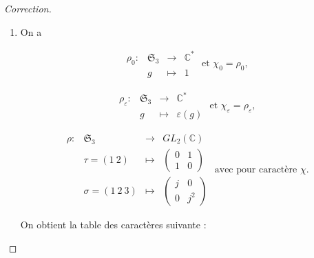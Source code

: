 \documentclass[french]{book}
\theoremstyle{definition}
\theoremstyle{remark}
\newtheorem*{remark}{Remarque}
\begin{document}
\begin{proof}[Correction]
\begin{enumerate}
\begin{enumerate}
\begin{enumerate}
        \begin{remark}[Personnelle]
          \textcolor{red}{3} correpond au nombre de \textcolor{red}{transpositions} dans \(\mathfrak{S}_{3}\) et \textcolor{blue}{2} correspond au nombre de \textcolor{blue}{3-cycles}. Puisque les transpositions (respectivement les 3-cycles) sont conjugués dans \(\mathfrak{S}_{3}\), la valeur de \(\rho_g\) et donc de \(\chi(g)\) est identique pour chaque transposition (respectivement pour chaque 3-cycle), donc on multiplie par 3 (respectivement par 2).
        \end{remark}

        \

        Donc \(\chi\) est bien un caractère \textbf{irréductible} de \(\mathfrak{S}_{3}\).
      \end{enumerate}

      \item On a

      \[\begin{matrix}
      \rho_0 : & \mathfrak{S}_{3} & \longrightarrow & \mathbb{C}^{*} \\
      \ & g & \longmapsto & 1
      \end{matrix} \text{ et } \chi_0 = \rho_0, \]

      \[\begin{matrix}
      \rho _{\varepsilon} : & \mathfrak{S}_{3} & \longrightarrow & \mathbb{C}^{*} \\
      \ & g & \longmapsto & \varepsilon(g)
      \end{matrix} \text{ et } \chi _{\varepsilon} = \rho _{\varepsilon}, \]

      \[\begin{matrix}
      \rho : & \mathfrak{S}_{3} & \longrightarrow & GL_2(\mathbb{C}) \\
      \ & \tau = (1 \ 2 ) & \longmapsto & \begin{pmatrix}
      0 & 1 \\
      1 & 0
      \end{pmatrix} \\
      \ & \sigma = (1 \ 2 \ 3) & \longmapsto & \begin{pmatrix}
      j & 0 \\
      0 & j^2
      \end{pmatrix}
      \end{matrix} \text{ avec pour caractère } \chi.  \]

      On obtient la table des caractères suivante :


\end{enumerate}
\end{enumerate}
\end{proof}
\end{document}
